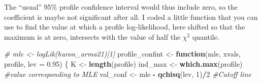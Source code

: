 \documentclass[]{book}
\newenvironment{Shaded}{\begin{snugshade}}{\end{snugshade}}
\newcommand{\KeywordTok}[1]{\textcolor[rgb]{0.13,0.29,0.53}{\textbf{#1}}}
\newcommand{\DataTypeTok}[1]{\textcolor[rgb]{0.13,0.29,0.53}{#1}}
\newcommand{\DecValTok}[1]{\textcolor[rgb]{0.00,0.00,0.81}{#1}}
\newcommand{\FloatTok}[1]{\textcolor[rgb]{0.00,0.00,0.81}{#1}}
\newcommand{\StringTok}[1]{\textcolor[rgb]{0.31,0.60,0.02}{#1}}
\newcommand{\CommentTok}[1]{\textcolor[rgb]{0.56,0.35,0.01}{\textit{#1}}}
\newcommand{\ControlFlowTok}[1]{\textcolor[rgb]{0.13,0.29,0.53}{\textbf{#1}}}
\newcommand{\OperatorTok}[1]{\textcolor[rgb]{0.81,0.36,0.00}{\textbf{#1}}}
\newcommand{\NormalTok}[1]{#1}
\begin{document}
The ``usual'' 95\% profile confidence interval would thus include zero,
so the coefficient is maybe not significant after all. I coded a little
function that you can use to find the value at which a profile
log-likelihood, here shifted so that the maximum is at zero, intersects
with the value of half the \(\chi^2\) quantile.

\begin{Shaded}
\begin{Highlighting}[]
\CommentTok{# mle <- logLik(huron_arma21)[1]}
\NormalTok{profile_confint <-}\StringTok{ }\ControlFlowTok{function}\NormalTok{(mle, xvals, profile, }\DataTypeTok{lev =} \FloatTok{0.95}\NormalTok{) \{}
\NormalTok{    K <-}\StringTok{ }\KeywordTok{length}\NormalTok{(profile)}
\NormalTok{    ind_max <-}\StringTok{ }\KeywordTok{which.max}\NormalTok{(profile)  }\CommentTok{#value corresponding to MLE}
\NormalTok{    val_conf <-}\StringTok{ }\NormalTok{mle }\OperatorTok{-}\StringTok{ }\KeywordTok{qchisq}\NormalTok{(lev, }\DecValTok{1}\NormalTok{)}\OperatorTok{/}\DecValTok{2}  \CommentTok{#Cutoff line}
    

\end{Highlighting}
\end{Shaded}
\end{document}
